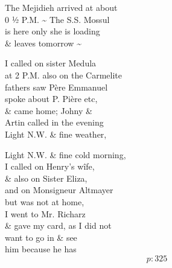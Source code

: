 \documentclass{report}
\begin{document}
	\par{
 	The Mejidieh arrived at about\ \\0 ½ P.M. \~{} The S.S. Mossul\ \\is here only she is loading\ \\\& leaves tomorrow \~{}\ \\
	}

	\par{
 	I called on sister Medula\ \\at 2 P.M. also on the Carmelite\ \\fathers saw Père Emmanuel\ \\spoke about P. Pière etc,\ \\\& came home; Johny \&\ \\Artin called in the evening\ \\Light N.W. \& fine weather,\ \\
	}

	\par{
 	Light N.W. \& fine cold morning,\ \\I called on Henry’s wîfe,\ \\\& also on Sister Eliza,\ \\and on Monsigneur Altmayer\ \\but was not at home,\ \\I went to Mr. Richarz\ \\\& gave my card, as I did not\ \\want to go in \& see\ \\him because he has\ \\
  \[p: 325 \]

	}


\end{document}
